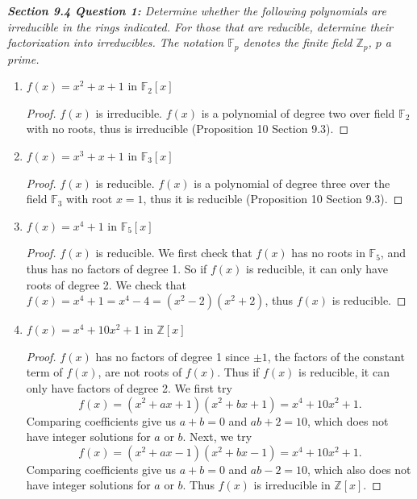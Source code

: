 \documentclass{article}
\begin{document}
\it \textbf{Section 9.4 Question 1:} Determine whether the following
  polynomials are irreducible in the rings indicated. For those that are
  reducible, determine their factorization into irreducibles. The notation
  $\mathbb{F}_p$ denotes the finite field $\mathbb{Z}_p$, $p$ a prime.

  \begin{enumerate}[label={(\alph*)}]
    \item $f(x)=x^2+x+1$ in $\mathbb{F}_2[x]$
      \begin{proof}
        $f(x)$ is irreducible. $f(x)$ is a polynomial of degree two over
        field $\mathbb{F}_2$ with no roots, thus is irreducible
        (Proposition 10 Section 9.3).
      \end{proof}

    \item $f(x)=x^3+x+1$ in $\mathbb{F}_3[x]$
      \begin{proof}
        $f(x)$ is reducible. $f(x)$ is a polynomial of degree three over
        the field $\mathbb{F}_3$ with root $x=1$, thus it is reducible
        (Proposition 10 Section 9.3).
      \end{proof}

    \item $f(x)=x^4+1$ in $\mathbb{F}_5[x]$
      \begin{proof}
        $f(x)$ is reducible. We first check that $f(x)$ has no roots in
        $\mathbb{F}_5$, and thus has no factors of degree 1. So if $f(x)$
        is reducible, it can only have roots of degree 2. We check that
        $f(x)=x^4+1=x^4-4=(x^2-2)(x^2+2)$, thus $f(x)$ is reducible.
      \end{proof}

    \item $f(x)=x^4+10x^2+1$ in $\mathbb{Z}[x]$
      \begin{proof}
        $f(x)$ has no factors of degree 1 since $\pm1$, the factors of the
        constant term of $f(x)$, are not roots of $f(x)$. Thus if $f(x)$ is
        reducible, it can only have factors of degree 2. We first try
        \[f(x)= (x^2+ax+1)(x^2+bx+1) =x^4+10x^2+1.\]
        Comparing coefficients give us $a+b=0$ and $ab+2=10$, which does
        not have integer solutions for $a$ or $b$. Next, we try
        \[f(x)= (x^2+ax-1)(x^2+bx-1) =x^4+10x^2+1.\]
        Comparing coefficients give us $a+b=0$ and $ab-2=10$, which also
        does not have integer solutions for $a$ or $b$. Thus $f(x)$ is
        irreducible in $\mathbb{Z}[x]$.
      \end{proof}
  \end{enumerate}
\end{document}
